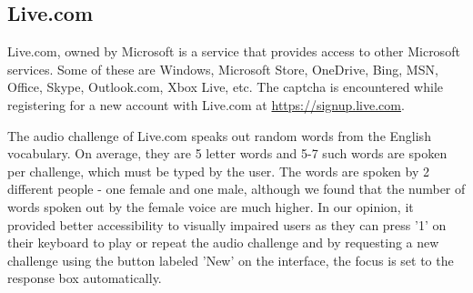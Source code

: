 \subsection{Live.com}

Live.com, owned by Microsoft is a service that provides access to other Microsoft services. 
Some of these are Windows, Microsoft Store, OneDrive, Bing, MSN, Office, Skype, Outlook.com, 
Xbox Live, etc. The captcha is encountered while registering for a new account with Live.com 
at \url{https://signup.live.com}.

The audio challenge of Live.com speaks out random words from the English vocabulary. On average, 
they are 5 letter words and 5-7 such words are spoken per challenge, which must be typed by the user. 
The words are spoken by 2 different people - one female and one male, although we found that the number 
of words spoken out by the female voice are much higher. In our opinion, it provided better accessibility 
to visually impaired users as they can press '1' on their keyboard to play or repeat the audio challenge 
and by requesting a new challenge using the button labeled 'New' on the interface, the focus is set to the 
response box automatically.
